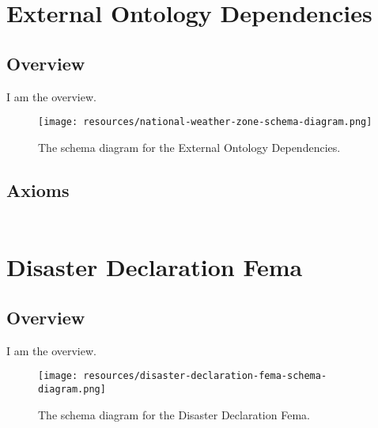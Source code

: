 
\section{External Ontology Dependencies}
\label{sec:external-ontology-dependencies}
\subsection{Overview}
\label{ssec:overview}

I am the overview.

\begin{figure}[h!]
  \begin{center}
    \texttt{[image: resources/national-weather-zone-schema-diagram.png]}
  \end{center}
  \caption{The schema diagram for the External Ontology Dependencies.}
  \label{fig:ov-diagram}
\end{figure}


\subsection{Axioms}
\begin{align}
\end{align}



\section{Disaster Declaration Fema}
\label{sec:disaster-declaration-fema}
\subsection{Overview}
\label{ssec:overview}

I am the overview.

\begin{figure}[h!]
  \begin{center}
    \texttt{[image: resources/disaster-declaration-fema-schema-diagram.png]}
  \end{center}
  \caption{The schema diagram for the Disaster Declaration Fema.}
  \label{fig:ov-diagram}
\end{figure}


